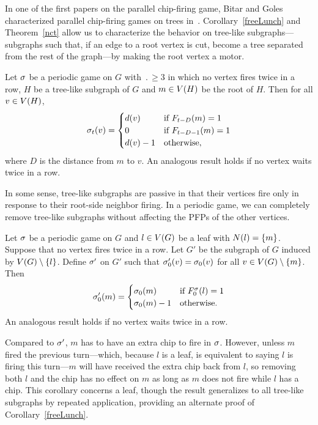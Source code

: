 In one of the first papers on the parallel chip-firing game, Bitar and Goles
characterized parallel chip-firing games on trees in~\cite{bitarGoles}.
Corollary~\ref{freeLunch} and Theorem~\ref{nct} allow us to characterize the
behavior on tree-like subgraphs---subgraphs such that, if an edge to a root
vertex is cut, become a tree separated from the rest of the graph---by making
the root vertex a motor.

\begin{cor}
Let $\s$ be a periodic game on $G$ with $\period \geq 3$ in which no vertex
fires twice in a row, $H$ be a tree-like subgraph of $G$ and $m \in \V[H]$ be
the root of $H$. Then for all $v \in \V[H]$,
\[
  \chips{v}{t} = \begin{cases}
    \deg{v} & \textnormal{if } \firing{m}{t-D} = 1 \\
    0 & \textnormal{if } \firing{m}{t-D-1} = 1 \\
    \deg{v} - 1 & \textnormal{otherwise},
  \end{cases}
\]
where $D$ is the distance from $m$ to $v$. An analogous result holds if no
vertex waits twice in a row.
\end{cor}

In some sense, tree-like subgraphs are passive in that their vertices fire only
in response to their root-side neighbor firing. In a periodic game, we can
completely remove tree-like subgraphs without affecting the PFPs of the other
vertices.

\begin{cor}
Let $\s$ be a periodic game on $G$ and $l \in \V$ be a leaf with $\N{l} =
\{m\}$. Suppose that no vertex fires twice in a row. Let $G'$ be the subgraph
of $G$ induced by $\V \setminus \{l\}$. Define $\s'$ on $G'$ such that
$\chips[\s']{v}{0} = \chips{v}{0}$ for all $v \in \V \setminus \{m\}$. Then
\[
  \chips[\s']{m}{0} = \begin{cases}
    \chips{m}{0} &\textnormal{if }\showhere{\firing{l}{0}} = 1 \\
    \chips{m}{0} - 1 &\textnormal{otherwise}.
  \end{cases}
\]
An analogous result holds if no vertex waits twice in a row.
\end{cor}

Compared to $\s'$, $m$ has to have an extra chip to fire in $\s$. However,
unless $m$ fired the previous turn---which, because $l$ is a leaf, is
equivalent to saying $l$ is firing this turn---$m$ will have received the extra
chip back from $l$, so removing both $l$ and the chip has no effect on $m$ as
long as $m$ does not fire while $l$ has a chip. This corollary concerns a leaf,
though the result generalizes to all tree-like subgraphs by repeated
application, providing an alternate proof of Corollary~\ref{freeLunch}.
